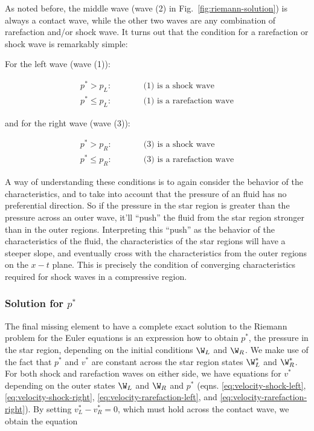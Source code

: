 As noted before, the middle wave (wave (2) in Fig.~\ref{fig:riemann-solution}) is always a
contact wave, while the other two waves are any combination of rarefaction and/or shock wave.
It turns out that the condition for a rarefaction or shock wave is remarkably simple:

For the left wave (wave (1)):

\begin{align}
	p^* > p_L: && &\quad \text{ (1) is a shock wave}\\
	p^* \leq p_L: && &\quad \text{ (1) is a rarefaction wave}
\end{align}

and for the right wave (wave (3)):

\begin{align}
	p^* > p_R: && & \quad \text{ (3) is a shock wave} \\
	p^* \leq p_R: && & \quad \text{ (3) is a rarefaction wave}
\end{align}

A way of understanding these conditions is to again consider the behavior of the characteristics,
and to take into account that the pressure of an fluid has no preferential direction. So if the
pressure in the star region is greater than the pressure across an outer wave, it'll ``push'' the
fluid from the star region stronger than in the outer regions. Interpreting this ``push'' as the
behavior of the characteristics of the fluid, the characteristics of the star regions will have a
steeper slope, and eventually cross with the characteristics from the outer regions on the $x-t$
plane. This is precisely the condition of converging characteristics required for shock waves in a
compressive region.








\subsubsection{Solution for $p^*$}

The final missing element to have a complete exact solution to the Riemann problem for the Euler
equations is an expression how to obtain $p^*$, the pressure in the star region, depending on the
initial conditions $\W_L$ and $\W_R$. We make use of the fact that $p^*$ and $v^*$ are constant
across the star region states $\W_L^*$ and $\W_R^*$. For both shock and rarefaction waves on either
side, we have equations for $v^*$ depending on the outer states  $\W_L$ and $\W_R$ and $p^*$ (eqns.
\ref{eq:velocity-shock-left}, \ref{eq:velocity-shock-right}, \ref{eq:velocity-rarefaction-left},
and \ref{eq:velocity-rarefaction-right}). By setting $v^*_L - v^*_R = 0$, which must hold across
the contact wave, we obtain the equation

